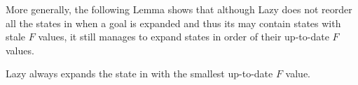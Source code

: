 More generally, the following Lemma shows that although Lazy \kastarmin does not reorder all the states in \open when a goal is expanded and thus its \open may contain states with stale $F$ values,
it still manages to expand states in order of their up-to-date $F$ values. %


\begin{lemma}
Lazy \kastarmin always expands the state in \open with the smallest up-to-date $F$ value. %
\label{the:lazy-minf-correct}
\end{lemma}
